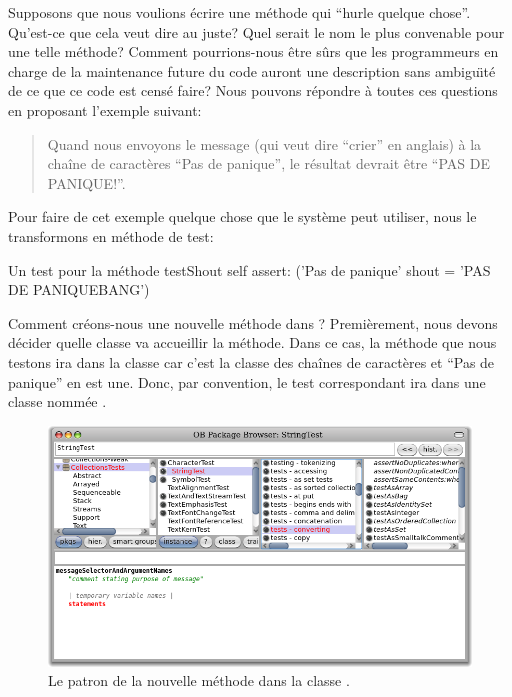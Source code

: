 \documentclass[a4paper,10pt,twoside]{book}
\begin{document}
Supposons que nous voulions écrire une méthode qui ``hurle quelque
chose''. Qu'est-ce que cela veut dire au juste? Quel serait le nom
le plus convenable pour une telle méthode? Comment pourrions-nous
être sûrs que les programmeurs en charge de la maintenance future
du code auront une description sans ambigu\"{\i}té de ce que ce code
est censé faire?
Nous pouvons répondre à toutes ces questions en proposant
l'exemple suivant:

\begin{quote}
Quand nous envoyons le message  (qui veut dire ``crier'' en anglais)
à la chaîne de caractères ``Pas de panique'', le résultat
devrait être ``PAS DE PANIQUE!''.
\end{quote}

\noindent
Pour faire de cet exemple quelque chose que le système peut
utiliser, nous le transformons en méthode de test:

\begin{method}[testShout]{Un test pour la méthode }
testShout
	self assert: ('Pas de panique' shout = 'PAS DE PANIQUEBANG')
\end{method} %

Comment créons-nous une nouvelle méthode dans \pharo? Premièrement,
nous devons décider quelle classe va accueillir la méthode.
Dans ce cas, la méthode  que nous testons ira dans la
classe 
car c'est la classe des chaînes de caractères et ``Pas de panique'' en est une.
Donc, par convention, le test correspondant ira dans une classe
nommée .

\begin{figure}[hbt]
	{\centerline {\includegraphics[width=\textwidth]{StringTest-newMethodTemplate}}}
\caption{Le patron de la nouvelle méthode dans la classe .
}
\end{figure}
\end{document}
